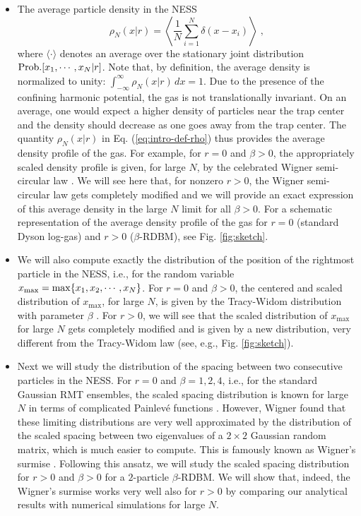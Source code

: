 \documentclass[onecolumn,superscriptaddress,
 amsmath,amssymb,
 aps,
 prd,
]{revtex4-1}
\begin{document}
\begin{itemize}
\item The average particle density in the NESS
\begin{equation} \label{eq:intro-def-rho}
\rho_N(x | r) = \left\langle \frac{1}{N}\sum_{i = 1}^N \delta(x - x_i) \right\rangle \;,
\end{equation}
where $\langle \cdot \rangle$ denotes an average over the stationary joint distribution ${\rm Prob.}[x_1, \cdots, x_N | r]$. Note that, by definition, the average density is normalized to unity: $\int_{-\infty}^\infty  \rho_N(x | r)\, dx = 1$. Due to the presence of the confining harmonic potential, the gas is not translationally invariant. On an average, one would expect a higher density of particles near the trap center and the density should decrease as one goes away from the trap center. The quantity $\rho_N(x | r)$ in Eq. (\ref{eq:intro-def-rho}) thus provides the average density profile of the gas. For example, for $r=0$ and $\beta >0$, the appropriately scaled density profile is given, for large $N$, by the celebrated Wigner semi-circular law \cite{M91}. We will see here that, for nonzero $r>0$, the Wigner semi-circular law gets completely modified and we will provide an exact expression of this average density in the large $N$ limit for all $\beta >0$. For a schematic representation of the average density profile of the gas for $r=0$ (standard Dyson log-gas) and $r>0$ ($\beta$-RDBM), see Fig. \ref{fig:sketch}.     



\item We will also compute exactly the distribution of the position of the rightmost particle in the NESS, i.e., for the random variable  
$x_{\rm max} = \max \{x_1, x_2, \cdots, x_N\}$. For $r=0$ and $\beta >0$, the centered and scaled distribution of $x_{\max}$, for large $N$, is given
by the Tracy-Widom distribution with parameter $\beta$ \cite{TW94,TW96}. For $r>0$, we will see that the scaled distribution of $x_{\max}$ for large $N$ gets completely modified and is given by a new distribution, very different from the Tracy-Widom law (see, e.g., Fig. \ref{fig:sketch}). 


\item Next we will study the distribution of the spacing between two consecutive particles in the NESS. For $r=0$ and $\beta = 1,2,4$, i.e., for the standard Gaussian RMT ensembles, the scaled spacing distribution is known for large $N$ in terms of complicated Painlev\'e functions \cite{F10}. However, Wigner found that these limiting distributions are very well approximated by the distribution of the scaled spacing between two eigenvalues of a $2 \times 2$ Gaussian random matrix, which is much easier to compute. This is famously known as Wigner's surmise \cite{Surmise}. Following this ansatz, we will study the scaled spacing distribution for $r>0$ and $\beta>0$ for a $2$-particle $\beta$-RDBM. We will show that, indeed, the Wigner's surmise works very well also for $r>0$ by comparing our analytical results with numerical simulations for large $N$.   





\end{itemize}
\end{document}
